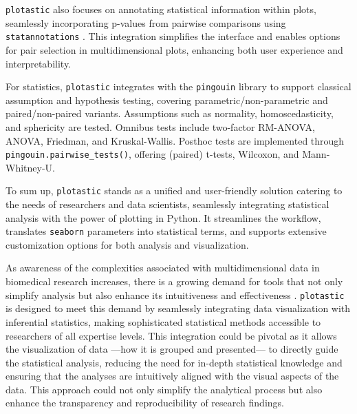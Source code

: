 \texttt{plotastic} also focuses on annotating statistical information within
plots, seamlessly incorporating p-values from pairwise comparisons using
\texttt{statannotations} \cite{charlierTrevismdStatannotationsV02022}. This
integration simplifies the interface and enables options for pair
selection in multidimensional plots, enhancing both user experience and
interpretability.

For statistics, \texttt{plotastic} integrates with the \texttt{pingouin} library
to support classical assumption and hypothesis testing, covering
parametric/non-parametric and paired/non-paired variants. Assumptions such as
normality, homoscedasticity, and sphericity are tested. Omnibus tests include
two-factor RM-ANOVA, ANOVA, Friedman, and Kruskal-Wallis. Posthoc tests are
implemented through \texttt{pingouin.pairwise\_tests()}, offering (paired)
t-tests, Wilcoxon, and Mann-Whitney-U.

To sum up, \texttt{plotastic} stands as a unified and user-friendly solution
catering to the needs of researchers and data scientists, seamlessly
integrating statistical analysis with the power of plotting in Python.
It streamlines the workflow, translates \texttt{seaborn} parameters into
statistical terms, and supports extensive customization options for both
analysis and visualization.

\newpage




%
\label{sec:C2_discussion}%
As awareness of the complexities associated with multidimensional data in
biomedical research increases, there is a growing demand for tools that not only
simplify analysis but also enhance its intuitiveness and effectiveness
\cite{dunnExploringVisualizingMultidimensional2017}. \texttt{plotastic} is
designed to meet this demand by seamlessly integrating data visualization with
inferential statistics, making sophisticated statistical methods accessible to
researchers of all expertise levels. This integration could be pivotal as it
allows the visualization of data —how it is grouped and presented— to directly
guide the statistical analysis, reducing the need for in-depth statistical
knowledge and ensuring that the analyses are intuitively aligned with the visual
aspects of the data. This approach could not only simplify the analytical process
but also enhance the transparency and reproducibility of research findings.



